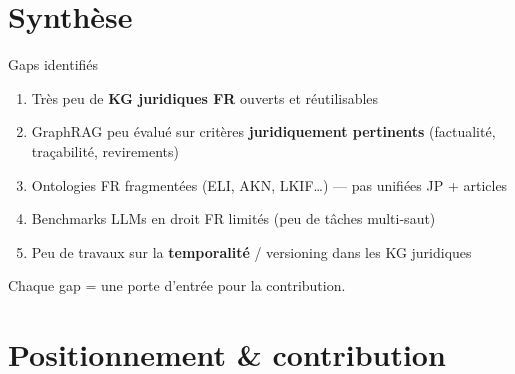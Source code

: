 \documentclass[aspectratio=169,10pt]{beamer}
\newcommand{\keybox}[1]{%
  \begin{center}
  \colorbox{accentsoft}{\parbox{0.9\linewidth}{\centering #1}}
  \end{center}}
\begin{document}
\section{Synthèse}

\begin{frame}{Gaps identifiés}
  \begin{enumerate}
    \item Très peu de \textbf{KG juridiques FR} ouverts et réutilisables
    \item GraphRAG peu évalué sur critères \textbf{juridiquement pertinents} (factualité, traçabilité, revirements)
    \item Ontologies FR fragmentées (ELI, AKN, LKIF\ldots) --- pas unifiées JP + articles
    \item Benchmarks LLMs en droit FR limités (peu de tâches multi-saut)
    \item Peu de travaux sur la \textbf{temporalité} / versioning dans les KG juridiques
  \end{enumerate}

  \vspace{0.5em}
  \keybox{Chaque gap = une porte d'entrée pour la contribution.}
\end{frame}

\section{Positionnement \& contribution}
\end{document}
